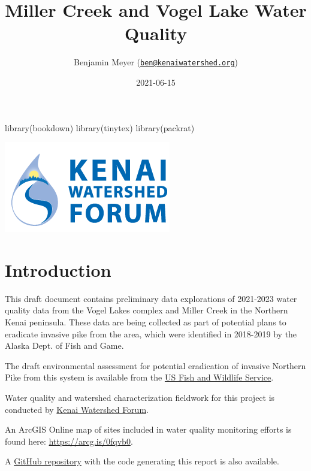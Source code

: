 \documentclass[
]{book}
\title{Miller Creek and Vogel Lake Water Quality}
\author{Benjamin Meyer (\href{mailto:ben@kenaiwatershed.org}{\nolinkurl{ben@kenaiwatershed.org}})}
\date{2021-06-15}
\newenvironment{Shaded}{\begin{snugshade}}{\end{snugshade}}
\newcommand{\FunctionTok}[1]{\textcolor[rgb]{0.00,0.00,0.00}{#1}}
\newcommand{\NormalTok}[1]{#1}
\begin{document}
\maketitle

{
\setcounter{tocdepth}{1}
\tableofcontents
}
\begin{Shaded}
\begin{Highlighting}[]
\FunctionTok{library}\NormalTok{(bookdown)}
\FunctionTok{library}\NormalTok{(tinytex)}
\FunctionTok{library}\NormalTok{(packrat)}
\end{Highlighting}
\end{Shaded}

\includegraphics{images/KWF_logo.png}

\hypertarget{introduction}{%
\chapter{Introduction}\label{introduction}}

This draft document contains preliminary data explorations of 2021-2023 water quality data from the Vogel Lakes complex and Miller Creek in the Northern Kenai peninsula. These data are being collected as part of potential plans to eradicate invasive pike from the area, which were identified in 2018-2019 by the Alaska Dept. of Fish and Game.

The draft environmental assessment for potential eradication of invasive Northern Pike from this system is available from the \href{https://www.fws.gov/uploadedFiles/Region_7/NWRS/Zone_2/Kenai/PDF/Draft\%20EA\%20Northern\%20Pike\%20KNWR.pdf}{US Fish and Wildlife Service}.

Water quality and watershed characterization fieldwork for this project is conducted by \href{https://www.kenaiwatershed.org/}{Kenai Watershed Forum}.

An ArcGIS Online map of sites included in water quality monitoring efforts is found here: \url{https://arcg.is/0fqvb0}.

A \href{https://github.com/Kenai-Watershed-Forum/Miller_Creek_Vogel_Lake_WQX}{GitHub repository} with the code generating this report is also available.
\end{document}

